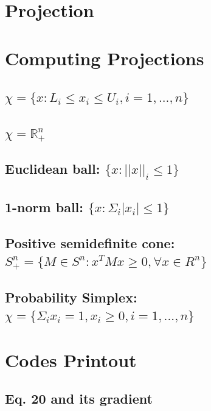 \documentclass[11pt,a4paper]{article}
\begin{document}
\newpage
\section{Projection}



\newpage
\section{Computing Projections}
\newcommand{\Rpn}{\mathbb{R}_+^n}
\newcommand{\Spn}{S_+^n}
\subsection{$\chi = \{x: L_i \leq x_i \leq U_i, i = 1, ..., n\}$}


\subsection{$\chi = \Rpn$}
\subsection{Euclidean ball: $\{x: || x ||_i \leq 1 \}$}
\subsection{1-norm ball: $\{x: \Sigma_i | x_i | \leq 1 \}$}
\subsection{Positive semidefinite cone: $\Spn = \{ M \in S^n: x^T M x \geq 0,
        \forall x \in R^n \}$ }
\subsection{Probability Simplex: $\chi = \{\Sigma_i x_i = 1, x_i \geq 0, i =
        1, ..., n \}$}

\newpage
\appendix
\section{Codes Printout}

\subsection{Eq. 20 and its gradient}


\end{document}
